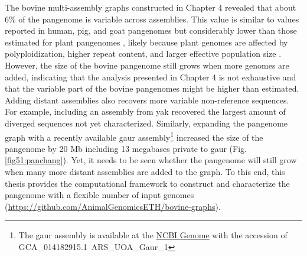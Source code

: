 \documentclass[../main.tex]{subfiles}
\begin{document}
The bovine multi-assembly graphs constructed in Chapter 4 revealed that about 6\% of the pangenome is variable across assemblies. This value is similar to values reported in human, pig, and goat pangenomes \citep{li2017comprehensive,li2019towards,duan2019hupan} but considerably lower than those estimated for plant pangenomes \citep{golicz2016pangenome,gordon2017extensive,gao2019tomato}, likely because plant genomes are affected by polyploidization, higher repeat content, and larger effective population size \citep{lei2021plant}. However, the size of the bovine pangenome still grows when more genomes are added, indicating that the analysis presented in Chapter 4 is not exhaustive and that the variable part of the bovine pangenomes might be higher than estimated. Adding distant assemblies also recovers more variable non-reference sequences. For example, including an assembly from yak recovered the largest amount of diverged sequences not yet characterized. Similarly, expanding the pangenome graph with a recently available gaur assembly\footnote{The gaur assembly is available at the \href{https://www.ncbi.nlm.nih.gov/genome/33929?genome_assembly_id=972991}{NCBI Genome} with the accession of GCA\_014182915.1\ ARS\_UOA\_Gaur\_1} increased the size of the pangenome by 20 Mb including 13 megabases private to gaur (Fig. \ref{fig51:panchang}). Yet, it needs to be seen whether the pangenome will still grow when many more distant assemblies are added to the graph. To this end, this thesis provides the computational framework to construct and characterize the pangenome with a flexible number of input genomes (\url{https://github.com/AnimalGenomicsETH/bovine-graphs}). 
\end{document}
